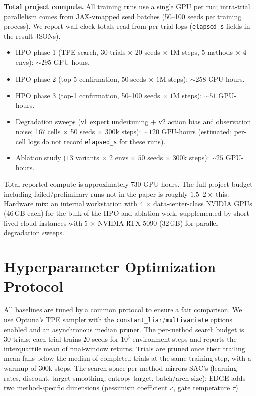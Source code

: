\documentclass{article}
\begin{document}
\textbf{Total project compute.} All training runs use a single GPU
per run; intra-trial parallelism comes from JAX-vmapped seed batches
(50--100 seeds per training process). We report wall-clock totals
read from per-trial logs (\texttt{elapsed\_s} fields in the result
JSONs).
\begin{itemize}[leftmargin=1.2em,itemsep=1pt,topsep=1pt]
  \item HPO phase 1 (TPE search, 30 trials $\times$ 20 seeds $\times$
        $1\mathrm{M}$ steps, 5 methods $\times$ 4 envs):
        $\sim$$295$ GPU-hours.
  \item HPO phase 2 (top-5 confirmation, 50 seeds $\times$ $1\mathrm{M}$
        steps): $\sim$$258$ GPU-hours.
  \item HPO phase 3 (top-1 confirmation, 50--100 seeds $\times$
        $1\mathrm{M}$ steps): $\sim$$51$ GPU-hours.
  \item Degradation sweeps (v1 expert undertuning $+$ v2 action bias and
        observation noise; 167 cells $\times$ 50 seeds $\times$ $300\mathrm{k}$
        steps): $\sim$$120$ GPU-hours (estimated; per-cell logs do not
        record \texttt{elapsed\_s} for these runs).
  \item Ablation study ($13$ variants $\times$ 2 envs $\times$ $50$
        seeds $\times$ $300\mathrm{k}$ steps): $\sim$$25$ GPU-hours.
\end{itemize}
Total reported compute is approximately $730$ GPU-hours. The full
project budget including failed/preliminary runs not in the paper is
roughly $1.5$--$2\times$ this. Hardware mix: an internal workstation with $4$
$\times$ data-center-class NVIDIA GPUs ($46$\,GB each) for the bulk
of the HPO and ablation work, supplemented by short-lived cloud
instances with $5$ $\times$ NVIDIA RTX 5090 ($32$\,GB) for parallel
degradation sweeps.


\section{Hyperparameter Optimization Protocol}
\label{app:hpo}

All baselines are tuned by a common protocol to ensure a fair
comparison. We use Optuna's TPE sampler with the
\texttt{constant\_liar}/\texttt{multivariate} options enabled and an
asynchronous median pruner. The per-method search budget is 30
trials; each trial trains 20 seeds for $10^6$ environment steps and
reports the interquartile mean of final-window returns. Trials are
pruned once their trailing mean falls below the median of completed
trials at the same training step, with a warmup of 300k steps. The
search space per method mirrors SAC's (learning rates, discount,
target smoothing, entropy target, batch/arch size); EDGE adds two
method-specific dimensions (pessimism coefficient $\kappa$, gate
temperature $\tau$).
\end{document}
